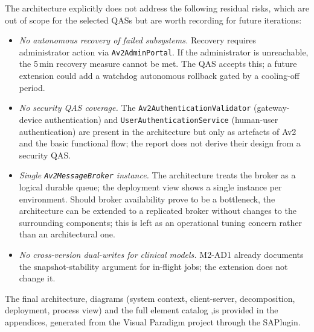 The architecture explicitly does not address the following residual
risks, which are out of scope for the selected QASs but are worth
recording for future iterations:
\begin{itemize}
  \item \emph{No autonomous recovery of failed subsystems.} Recovery
        requires administrator action via \texttt{Av2AdminPortal}. If
        the administrator is unreachable, the 5\,min recovery measure
        cannot be met. The QAS accepts this; a future extension could
        add a watchdog autonomous rollback gated by a cooling-off
        period.
  \item \emph{No security QAS coverage.} The
        \texttt{Av2AuthenticationValidator} (gateway-device
        authentication) and \texttt{UserAuthenticationService}
        (human-user authentication) are present in the architecture but
        only as artefacts of Av2 and the basic functional flow; the
        report does not derive their design from a security QAS.
  \item \emph{Single \texttt{Av2MessageBroker} instance.} The
        architecture treats the broker as a logical durable queue; the
        deployment view shows a single instance per environment.
        Should broker availability prove to be a bottleneck, the
        architecture can be extended to a replicated broker without
        changes to the surrounding components; this is left as an
        operational tuning concern rather than an architectural one.
  \item \emph{No cross-version dual-writes for clinical models.}
        M2-AD1 already documents the snapshot-stability argument for
        in-flight jobs; the extension does not change it.
\end{itemize}

\bigskip
The final architecture, diagrams (system context, client-server, decomposition, deployment, process view) and the full element catalog ,is provided in the appendices, generated from the Visual Paradigm project through the SAPlugin.
